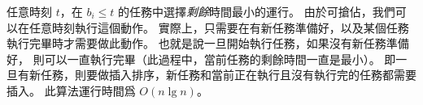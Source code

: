 \startANSWER
任意時刻 $t$，在 $b_i \le t$ 的任務中選擇\emph{剩餘}時間最小的運行。
由於可搶佔，我們可以在任意時刻執行這個動作。
實際上，只需要在有新任務準備好，以及某個任務執行完畢時才需要做此動作。
也就是說一旦開始執行任務，如果沒有新任務準備好，
則可以一直執行完畢（此過程中，當前任務的剩餘時間一直是最小）。
即一旦有新任務，則要做插入排序，新任務和當前正在執行且沒有執行完的任務都需要插入。
此算法運行時間爲 $O(n\lg n)$。
\stopANSWER

\stopPROBLEM
